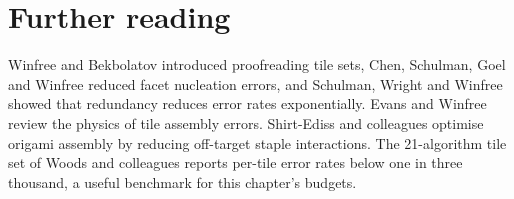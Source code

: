 \section*{Further reading}
Winfree and Bekbolatov introduced proofreading tile sets,\cite{WinfreeBekbolatov2004}
Chen, Schulman, Goel and Winfree reduced facet nucleation errors,\cite{Chen2007}
and Schulman, Wright and Winfree showed that redundancy reduces error rates
exponentially.\cite{Schulman2015} Evans and Winfree review the physics of tile
assembly errors.\cite{EvansWinfree2017} Shirt-Ediss and colleagues optimise origami
assembly by reducing off-target staple interactions.\cite{ShirtEdiss2026} The
21-algorithm tile set of Woods and colleagues reports per-tile error rates below
one in three thousand,\cite{Woods2019} a useful benchmark for this chapter's
budgets.
